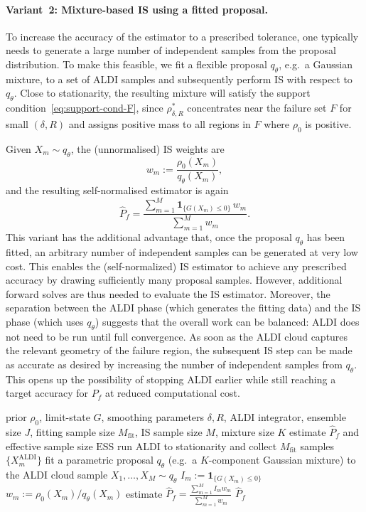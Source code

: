 \documentclass[a4paper]{article}
\numberwithin{equation}{section}
\begin{document}
\paragraph{Variant~2: Mixture-based IS using a fitted proposal.}
To increase the accuracy of the estimator to a prescribed tolerance, one
typically needs to generate a large number of independent samples from the
proposal distribution.  
To make this feasible, we fit a flexible proposal
$q_\theta$, e.g.\ a Gaussian mixture, to a set of ALDI samples
and subsequently perform IS with respect to $q_\theta$. Close to stationarity, the resulting mixture will satisfy the support condition~\eqref{eq:support-cond-F}, since
$\rho^*_{\delta,R}$ concentrates near the failure set $F$ for small
$(\delta,R)$ and assigns positive mass to all regions in $F$ where
$\rho_0$ is positive.  

Given $X_m\sim q_\theta$, the (unnormalised) IS weights are
\[
  w_m := \frac{\rho_0(X_m)}{q_\theta(X_m)},
\]
and the resulting self-normalised estimator is again
\[
  \widehat P_f
  = \frac{\sum_{m=1}^M\mathbf{1}_{\{G(X_m)\le 0\}}\,w_m}
         {\sum_{m=1}^M w_m}.
\]
This variant has the additional advantage that, once the proposal $q_\theta$ has
been fitted, an arbitrary number of independent samples can be generated at very
low cost. This enables the (self-normalized) IS estimator to achieve any prescribed accuracy
by drawing sufficiently many proposal samples. However, additional forward solves are thus needed to evaluate the IS estimator. 
Moreover, the separation between the ALDI phase (which generates the fitting
data) and the IS phase (which uses $q_\theta$) suggests that the overall work
can be balanced: ALDI does not need to be run until full convergence. As soon as
the ALDI cloud captures the relevant geometry of the failure region, the
subsequent IS step can be made as accurate as desired by increasing the number
of independent samples from $q_\theta$. This opens up the possibility of stopping
ALDI earlier while still reaching a target accuracy for $P_f$ at reduced
computational cost.

\begin{algorithm}[t]
\caption{Mixture-based IS fitted to ALDI samples}
\label{alg:aldi_mixture_is}
\begin{algorithmic}[1]
\Require prior $\rho_0$, limit-state $G$, smoothing parameters $\delta,R$,
         ALDI integrator, ensemble size $J$,
         fitting sample size $M_{\mathrm{fit}}$, IS sample size $M$,
         mixture size $K$
\Ensure estimate $\widehat P_f$ and effective sample size $\mathrm{ESS}$
\State run ALDI to stationarity and collect $M_{\mathrm{fit}}$ samples
       $\{X^{\mathrm{ALDI}}_m\}$
\State fit a parametric proposal $q_\theta$
       (e.g.\ a $K$-component Gaussian mixture) to the ALDI cloud
\State sample $X_1,\dots,X_M\sim q_\theta$
  \State $I_m:=\mathbf{1}_{\{G(X_m)\le 0\}}$
  \State $w_m:=\rho_0(X_m)/q_\theta(X_m)$
\EndFor
\State estimate
       $\displaystyle
        \widehat P_f=
        \frac{\sum_{m=1}^M I_m w_m}{\sum_{m=1}^M w_m}$
\State \Return $\widehat P_f$
\end{algorithmic}
\end{algorithm}
\end{document}
